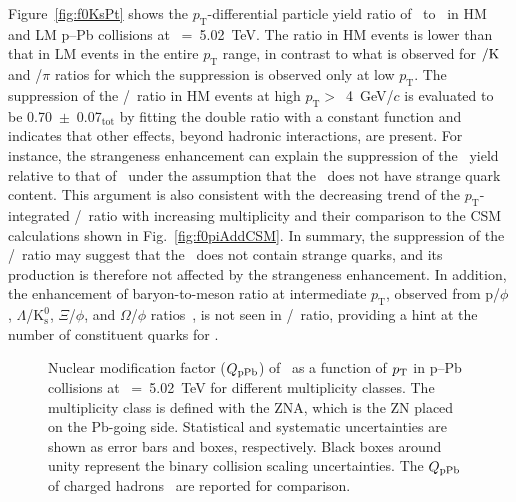 Figure~\ref{fig:f0KsPt} shows the $p_{\mathrm{T}}$-differential particle yield ratio of \fzero~to \kstar~in HM and LM p--Pb collisions at \snn~=~5.02~TeV. The ratio in HM events is lower than that in LM events in the entire $p_{\mathrm{T}}$ range, in contrast to what is observed for \kstar$\rm{}/K$ and \fzero/$\pi$ ratios for which the suppression is observed only at low $p_{\mathrm{T}}$. The suppression of the \fzero/\kstar~ratio in HM events at high $p_{\mathrm{T}}>$~4~GeV/$c$ is evaluated to be 0.70~$\pm$~0.07$_{\mathrm{tot}}$ by fitting the double ratio with a constant function and indicates that other effects, beyond hadronic interactions, are present. For instance, the strangeness enhancement can explain the suppression of the \fzero~yield relative to that of \kstar~under the assumption that the \fzero~does not have strange quark content. This argument is also consistent with the decreasing trend of the $p_{\mathrm{T}}$-integrated \fzero/\kstar~ratio with increasing multiplicity and their comparison to the CSM calculations shown in Fig.~\ref{fig:f0piAddCSM}. In summary, the suppression of the \fzero/\kstar~ratio may suggest that the \fzero~does not contain strange quarks, and its production is therefore not affected by the strangeness enhancement. In addition, the enhancement of baryon-to-meson ratio at intermediate $p_{\mathrm{T}}$, observed from p/$\phi$, $\Lambda$/$\mathrm{K}_{\mathrm{s}}^{0}$, $\Xi$/$\phi$, and $\Omega$/$\phi$ ratios~\cite{ALICE:2020jsh}, is not seen in \fzero/\kstar~ratio, providing a hint at the number of constituent quarks for \fzero.

\begin{figure}[!hbt]
	\centering
	\caption{ Nuclear modification factor ($Q_{\rm{pPb}}$) of \fzero~as a function of $p_{\rm{T}}$ in p--Pb collisions at \snn~=~5.02~TeV for different multiplicity classes. The multiplicity class is defined with the ZNA, which is the ZN placed on the Pb-going side. Statistical and systematic uncertainties are shown as error bars and boxes, respectively. Black boxes around unity represent the binary collision scaling uncertainties. The $Q_{\rm{pPb}}$ of charged hadrons~\cite{ALICE:2014xsp} are reported for comparison. }
	\label{fig:QpPb}
\end{figure}

